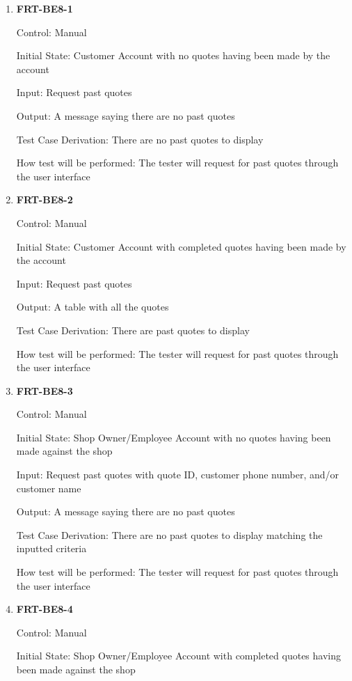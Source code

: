 \documentclass[12pt, titlepage]{article}
\begin{document}
\begin{enumerate}

	\item \textbf{FRT-BE8-1}

	      Control: Manual

	      Initial State: Customer Account with no quotes having been made by the account

	      Input: Request past quotes

	      Output: A message saying there are no past quotes

	      Test Case Derivation: There are no past quotes to display

	      How test will be performed: The tester will request for past quotes through the user interface

	\item \textbf{FRT-BE8-2}

	      Control: Manual

	      Initial State: Customer Account with completed quotes having been made by the account

	      Input: Request past quotes

	      Output: A table with all the quotes

	      Test Case Derivation: There are past quotes to display

	      How test will be performed: The tester will request for past quotes through the user interface

	\item \textbf{FRT-BE8-3}

	      Control: Manual

	      Initial State: Shop Owner/Employee Account with no quotes having been made against the shop

	      Input: Request past quotes with quote ID, customer phone number, and/or customer name

	      Output: A message saying there are no past quotes

	      Test Case Derivation: There are no past quotes to display matching the inputted criteria

	      How test will be performed: The tester will request for past quotes through the user interface

	\item \textbf{FRT-BE8-4}

	      Control: Manual

	      Initial State: Shop Owner/Employee Account with completed quotes having been made against the shop


\end{enumerate}
\end{document}
